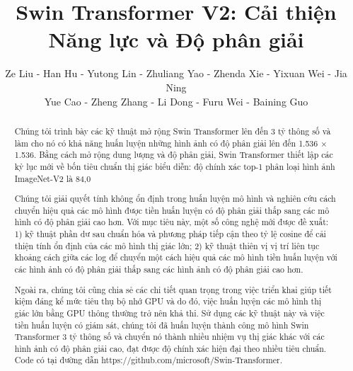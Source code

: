 \documentclass[times, twoside]{zHenriquesLab-StyleBioRxiv}
\begin{document}
\title{Swin Transformer V2: Cải thiện Năng lực và Độ phân giải}


\author{Ze Liu - Han Hu - Yutong Lin - Zhuliang Yao - Zhenda Xie - Yixuan Wei - Jia Ning \\ Yue Cao - Zheng Zhang - Li Dong - Furu Wei - Baining Guo}


\maketitle

\begin{abstract}
Chúng tôi trình bày các kỹ thuật mở rộng Swin Transformer lên đến 3 tỷ thông số và làm cho nó có khả năng huấn luyện những hình ảnh có độ phân giải lên đến 1.536 × 1.536. Bằng cách mở rộng dung lượng và độ phân giải, Swin Transformer thiết lập các kỷ lục mới về bốn tiêu chuẩn thị giác biểu diễn: độ chính xác top-1 phân loại hình ảnh ImageNet-V2 là 84,0%

Chúng tôi giải quyết tính không ổn định trong huấn luyện mô hình và nghiên cứu cách chuyển hiệu quả các mô hình được tiền huấn luyện có độ phân giải thấp sang các mô hình có độ phân giải cao hơn. Với mục tiêu này, một số công nghệ mới được đề xuất: 1) kỹ thuật phần dư sau chuẩn hóa và phương pháp tiếp cận theo tỷ lệ cosine để cải thiện tính ổn định của các mô hình thị giác lớn; 2) kỹ thuật thiên vị vị trí liên tục khoảng cách giữa các log để chuyển một cách hiệu quả các mô hình tiền huấn luyện với các hình ảnh có độ phân giải thấp sang các hình ảnh có độ phân giải cao hơn.

Ngoài ra, chúng tôi cũng chia sẻ các chi tiết quan trọng trong việc triển khai giúp tiết kiệm đáng kể mức tiêu thụ bộ nhớ GPU và do đó, việc huấn luyện các mô hình thị giác lớn bằng GPU thông thường trở nên khả thi. Sử dụng các kỹ thuật này và việc tiền huấn luyện có giám sát, chúng tôi đã huấn luyện thành công mô hình Swin Transformer 3 tỷ thông số và chuyển nó thành nhiều nhiệm vụ thị giác khác với các hình ảnh có độ phân giải cao, đạt được độ chính xác hiện đại theo nhiều tiêu chuẩn. Code có tại đường dẫn https://github.com/microsoft/Swin-Transformer.
\end {abstract}
\end{document}
